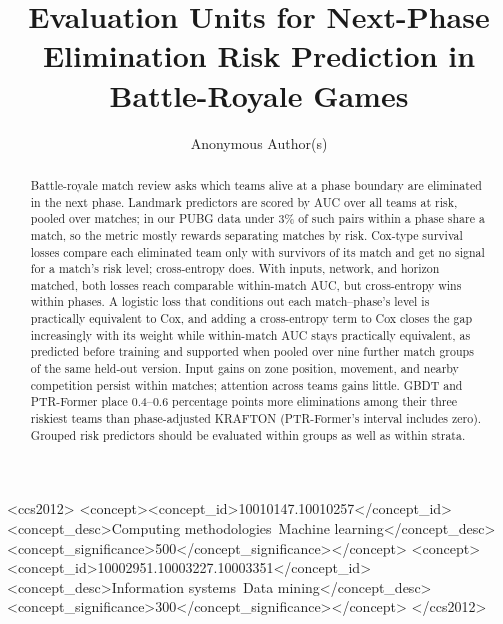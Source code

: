 \documentclass[sigconf,anonymous]{acmart}
\begin{document}
\title{Evaluation Units for Next-Phase Elimination Risk Prediction in Battle-Royale Games}
\renewcommand{\shorttitle}{Evaluation Units for Next-Phase Elimination Prediction}

\author{Anonymous Author(s)}

\begin{abstract}
Battle-royale match review asks which teams alive at a phase boundary are eliminated in the next phase. Landmark predictors are scored by AUC over all teams at risk, pooled over matches; in our PUBG data under 3\% of such pairs within a phase share a match, so the metric mostly rewards separating matches by risk. Cox-type survival losses compare each eliminated team only with survivors of its match and get no signal for a match's risk level; cross-entropy does. With inputs, network, and horizon matched, both losses reach comparable within-match AUC, but cross-entropy wins within phases. A logistic loss that conditions out each match--phase's level is practically equivalent to Cox, and adding a cross-entropy term to Cox closes the gap increasingly with its weight while within-match AUC stays practically equivalent, as predicted before training and supported when pooled over nine further match groups of the same held-out version. Input gains on zone position, movement, and nearby competition persist within matches; attention across teams gains little. GBDT and PTR-Former place 0.4--0.6 percentage points more eliminations among their three riskiest teams than phase-adjusted KRAFTON (PTR-Former's interval includes zero). Grouped risk predictors should be evaluated within groups as well as within strata.
\end{abstract}
\begin{CCSXML}
<ccs2012>
<concept><concept_id>10010147.10010257</concept_id><concept_desc>Computing methodologies~Machine learning</concept_desc><concept_significance>500</concept_significance></concept>
<concept><concept_id>10002951.10003227.10003351</concept_id><concept_desc>Information systems~Data mining</concept_desc><concept_significance>300</concept_significance></concept>
</ccs2012>
\end{CCSXML}
\maketitle
\end{document}
